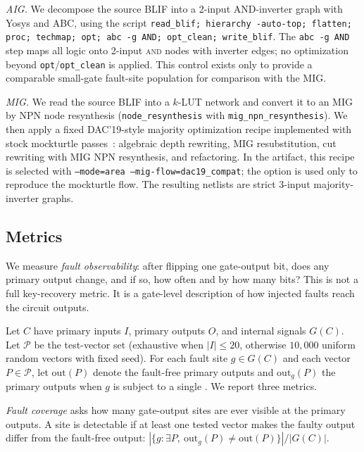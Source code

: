 \textit{AIG.} We decompose the source BLIF into a 2-input AND-inverter
graph with Yosys and ABC, using the script
\texttt{read\_blif; hierarchy -auto-top; flatten; proc; techmap; opt;
abc -g AND; opt\_clean; write\_blif}. The \texttt{abc -g AND} step maps
all logic onto 2-input \textsc{and} nodes with inverter edges; no
optimization beyond \texttt{opt}/\texttt{opt\_clean} is applied. This
control exists only to provide a comparable small-gate fault-site
population for comparison with the MIG.

\textit{MIG.} We read the source BLIF into a $k$-LUT network and convert
it to an MIG by NPN node resynthesis
(\texttt{node\_resynthesis} with \texttt{mig\_npn\_resynthesis}). We then
apply a fixed DAC'19-style majority optimization recipe implemented with
stock mockturtle passes~\cite{amaru2019synth}: algebraic depth rewriting,
MIG resubstitution, cut rewriting with MIG NPN resynthesis, and
refactoring. In the artifact, this recipe is selected with
\texttt{--mode=area --mig-flow=dac19\_compat}; the option is used only
to reproduce the mockturtle flow. The resulting netlists are strict
3-input majority-inverter graphs.

\subsection{Metrics}
\label{sec:methodology:metrics}

We measure \emph{fault observability}: after flipping one gate-output
bit, does any primary output change, and if so, how often and by how
many bits? This is not a full key-recovery metric. It is a gate-level
description of how injected faults reach the circuit outputs.

Let $C$ have primary inputs $I$, primary outputs $O$, and internal
signals $G(C)$. Let $\mathcal{P}$ be the test-vector set (exhaustive
when $|I| \le 20$, otherwise $10{,}000$ uniform random vectors with
fixed seed). For each fault site $g \in G(C)$ and each vector
$P \in \mathcal{P}$, let $\text{out}(P)$ denote the fault-free primary
outputs and $\text{out}_g(P)$ the primary outputs when $g$ is subject
to a single \bitflip{}. We report three metrics.

\textit{Fault coverage} \FCpct{} asks how many gate-output sites are
ever visible at the primary outputs. A site is detectable if at least
one tested vector makes the faulty output differ from the fault-free
output:
$|\{g : \exists P,\ \text{out}_g(P) \ne \text{out}(P)\}| / |G(C)|$.

